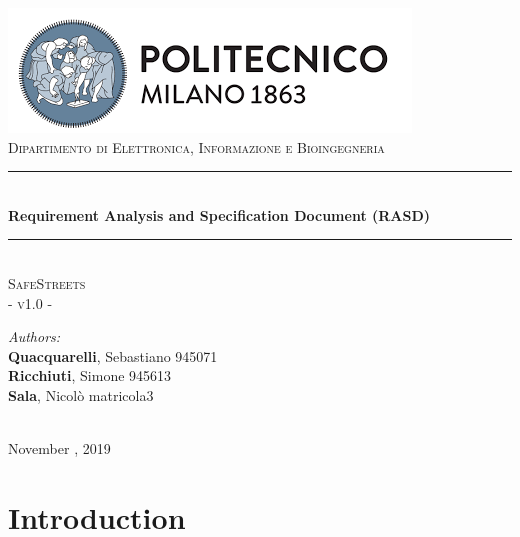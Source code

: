 \documentclass{article}
\begin{document}
    \begin{titlepage}
    
        \centering
		\vspace*{0.7 cm}
		\includegraphics[scale = 0.7]{images/PolimiLogo.png}\\[1 cm]
		\textsc{\large Dipartimento di Elettronica, Informazione e Bioingegneria}\\[2 cm]
		
		\rule{\linewidth}{0.2 mm} \\[0.5 cm]
		{\huge \bfseries Requirement Analysis and Specification Document (RASD)}\\
		\rule{\linewidth}{0.2 mm} \\[1.5 cm]
		
		\textsc{\Large SafeStreets}\\[0.5 cm]
		\textsc{\large - v1.0 -}\\[1 cm]

		\begin{minipage}{\textwidth}
            \begin{flushleft} \large
    				\emph{Authors:}\\
    				\textbf{Quacquarelli}, Sebastiano \hfill 945071 \\
    				\textbf{Ricchiuti}, Simone \hfill 945613  \\
    				\textbf{Sala}, Nicolò \hfill matricola3 \\[2 cm]
    		\end{flushleft}
		\end{minipage}\\[2 cm]
		
        {\large November  , 2019}\\[2 cm]
        
    \end{titlepage}
    
    \tableofcontents
    
    \newpage
    
    \section{Introduction}
\end{document}

